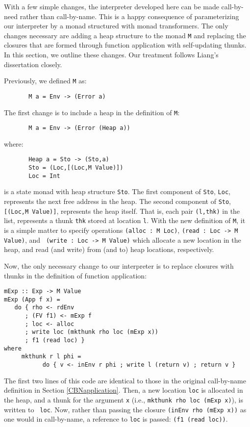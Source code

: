 \documentclass{entcs} \usepackage{entcsmacro}
\begin{document}
{With a few simple changes, the interpreter developed here can be made call-by-need
rather than call-by-name. This is a happy consequence of parameterizing our
interpreter by a monad structured with monad
transformers\cite{LiangHudak,LiangThesis}. The only changes necessary are adding a
heap structure to the monad {\tt M} and replacing the closures that are formed
through function application with self-updating thunks. In this section, we outline
these changes. Our treatment follows Liang's dissertation\cite{LiangThesis}
closely.

Previously, we defined {\tt M} as:
\begin{verbatim}
       M a = Env -> (Error a)
\end{verbatim}
The first change is to include a heap in the definition of {\tt M}:
\begin{verbatim}
       M a = Env -> (Error (Heap a))
\end{verbatim}
\noindent where:
\begin{verbatim}
       Heap a = Sto -> (Sto,a)
       Sto = (Loc,[(Loc,M Value)])
       Loc = Int
\end{verbatim}

 is a state monad with heap structure {\tt Sto}. The first
component of {\tt Sto}, {\tt Loc}, represents the next free address in the heap. The
second component of {\tt Sto}, {\tt [(Loc,M Value)]}, represents the heap itself.
That is, each pair \verb+(l,thk)+ in the list, represents a thunk {\tt thk} stored at
location {\tt l}. With the new definition of {\tt M}, it is a simple matter to
specify operations {\tt (alloc : M Loc)}, {\tt (read : Loc -> M Value)}, and {\tt
(write : Loc -> M Value)} which allocate a new location in the heap, and read (and
write) from (and to) heap locations, respectively.

Now, the only necessary change to our interpreter is to replace closures with
thunks in the definition of function application:
{\small
\begin{verbatim}
mExp :: Exp -> M Value
mExp (App f x) =
   do { rho <- rdEnv
      ; (FV f1) <- mExp f
      ; loc <- alloc
      ; write loc (mkthunk rho loc (mExp x))
      ; f1 (read loc) }
where
     mkthunk r l phi = 
           do { v <- inEnv r phi ; write l (return v) ; return v }
\end{verbatim}
}

The first two lines of this code are identical to those in the
original call-by-name definition in Section \ref{CBNapplication}.
Then, a new location {\tt loc} is allocated in the heap, and a thunk for
the argument {\tt x} (i.e., {\tt mkthunk rho loc (mExp x)}), is written to {\tt
loc}. Now, rather than passing the closure {\tt (inEnv rho (mExp x))} as one
would in call-by-name, a reference to {\tt loc} is 
passed: {\tt (f1 (read loc))}. 

}
\end{document}
